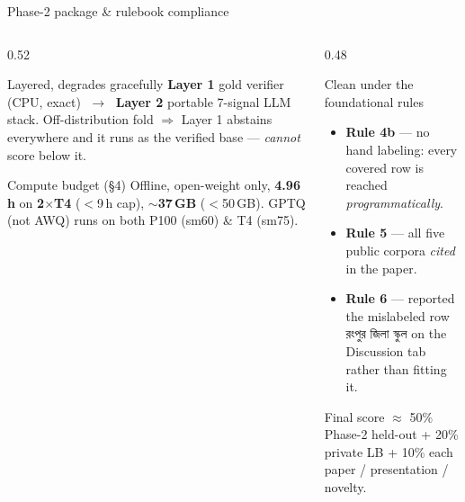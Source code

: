 \documentclass[aspectratio=169,11pt,t]{beamer}
\newcommand{\bn}[1]{{\bnfont #1}}
\newcommand{\metric}[1]{{\color{primary}\bfseries #1}}
\begin{document}
\begin{frame}{Phase-2 package \& rulebook compliance}
  \begin{columns}[T]
    \begin{column}{0.52\textwidth}
      \begin{block}{Layered, degrades gracefully}
        \textbf{Layer 1} gold verifier (CPU, exact) $\;\to\;$ \textbf{Layer 2} portable 7-signal LLM stack. Off-distribution fold $\Rightarrow$ Layer 1 abstains everywhere and it runs as the verified base — \emph{cannot} score below it.
      \end{block}
      \begin{block}{Compute budget (§4)}
        \footnotesize Offline, open-weight only, \metric{4.96\,h} on \metric{2$\times$T4} ($<$9\,h cap), \metric{$\sim$37\,GB} ($<$50\,GB). GPTQ (not AWQ) runs on both P100 (sm60) \& T4 (sm75).
      \end{block}
    \end{column}
    \begin{column}{0.48\textwidth}
      \begin{block}{Clean under the foundational rules}
        \small
        \begin{itemize}
          \item \textbf{Rule 4b} — no hand labeling: every covered row is reached \emph{programmatically}.
          \item \textbf{Rule 5} — all five public corpora \emph{cited} in the paper.
          \item \textbf{Rule 6} — reported the mislabeled row \bn{রংপুর জিলা স্কুল} on the Discussion tab rather than fitting it.
        \end{itemize}
      \end{block}
      \vspace{0.2em}
      {\scriptsize\color{soft} Final score $\approx$ 50\% Phase-2 held-out + 20\% private LB + 10\% each paper / presentation / novelty.}
    \end{column}
  \end{columns}
\end{frame}
\end{document}
